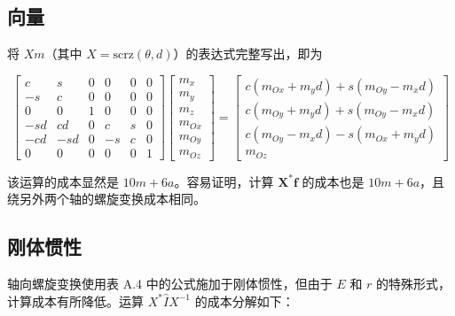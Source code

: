 \documentclass[10pt,a4paper]{book}
\theoremstyle{thmstyle} %
\theoremstyle{defstyle} %
\theoremstyle{prostyle} %
\begin{document}
\subsection{向量}





将 $Xm$（其中 $X = \text{scrz}(\theta, d)$）的表达式完整写出，即为



$$
\left[ \begin{array}{llllll} { c } & { s } & { 0 } & { 0 } & { 0 } & { 0 } \\{ - s } & { c } & { 0 } & { 0 } & { 0 } & { 0 } \\{ 0 } & { 0 } & { 1 } & { 0 } & { 0 } & { 0 } \\{ - s d } & { c d } & { 0 } & { c } & { s } & { 0 } \\{ - c d } & { - s d } & { 0 } & { - s } & { c } & { 0 } \\{ 0 } & { 0 } & { 0 } & { 0 } & { 0 } & { 1 } \end{array} \right] \left[ \begin{array}{l} { m _ { x } } \\{ m _ { y } } \\{ m _ { z } } \\{ m _ { O x } } \\{ m _ { O y } } \\{ m _ { O z } } \end{array} \right] = \left[ \begin{array}{l} { c ( m _ { O x } + m _ { y } d ) + s ( m _ { O y } - m _ { x } d ) } \\{ c ( m _ { O y } + m _ { y } d ) + s ( m _ { O y } - m _ { x } d ) } \\{ c ( m _ { O y } - m _ { x } d ) - s ( m _ { O x } + m _ { y } d ) } \\{ m _ { O z } } \end{array} \right]
$$



该运算的成本显然是 $10m+6a$。容易证明，计算 $\mathbf{X}^*\mathbf{f}$ 的成本也是 $10m+6a$，且绕另外两个轴的螺旋变换成本相同。



\subsection{刚体惯性}





轴向螺旋变换使用表 A.4 中的公式施加于刚体惯性，但由于 $E$ 和 $r$ 的特殊形式，计算成本有所降低。运算 $X^*\hat{I}X^{-1}$ 的成本分解如下：
\end{document}
